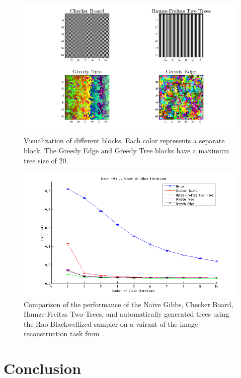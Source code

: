 \documentclass{article} %
\begin{document}
\begin{figure}
\begin{center}
\includegraphics[width=5in]{figures/block_maps.png}
\caption[]{Visualization of different blocks. Each color represents a separate block. The Greedy Edge and Greedy Tree blocks have a maximum tree size of $20$.}
\label{fig:blockMaps}
\end{center}
\end{figure}

\begin{figure}
\begin{center}
\includegraphics[width=5in]{figures/figure7_real}
\caption[]{Comparison of the performance of the Naive Gibbs, Checker Board, Hamze-Freitas Two-Trees, and automatically generated trees using the Rao-Blackwellized sampler on a vairant of the image reconstruction task from~\cite{hamze2004fields}.}
\label{fig:imageRecon}
\end{center}
\end{figure}

\section{Conclusion}
\end{document}
